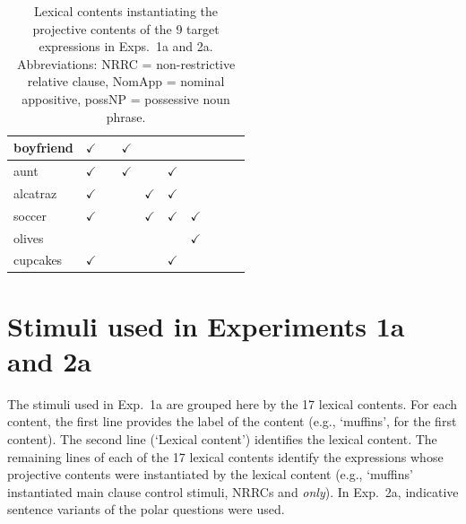 \documentclass[11pt,fleqn]{article}
\newcommand{\6}{\mbox{$[\hspace*{-.6mm}[$}}
\newcommand{\9}{\mbox{$]\hspace*{-.6mm}]$}}
\begin{document}
\begin{table}[h!]
\begin{center}
\begin{tabular}{l|ccccccccc}
boyfriend & $\checkmark$ & & $\checkmark$ & & & & & &  \\

\hline

aunt & $\checkmark$ & & $\checkmark$ & & $\checkmark$ & & & &  \\

\hline

alcatraz & $\checkmark$ & & & $\checkmark$ & $\checkmark$ & & & &  \\

\hline

soccer & $\checkmark$ & & & $\checkmark$ & $\checkmark$ & $\checkmark$ & & &  \\

\hline

olives & & & & & & $\checkmark$ & & &  \\

\hline

cupcakes & $\checkmark$ & & & & $\checkmark$ & & & &  \\

\hline

\end{tabular}
\end{center}
\caption{Lexical contents instantiating the projective contents of the 9 target expressions in Exps.~1a and 2a. Abbreviations: NRRC = non-restrictive relative clause, NomApp = nominal appositive, possNP = possessive noun phrase.}\label{t-trigger-content-pairs}
\end{table}

\section{Stimuli used in Experiments 1a and 2a}\label{a-exp1a-2a-stimuli}

The stimuli used in Exp.~1a are grouped here by the 17 lexical contents. For each content, the first line provides the label of the content (e.g., `muffins', for the first content). The second line (`Lexical content') identifies the lexical content. The remaining lines of each of the 17 lexical contents identify the expressions whose projective contents were instantiated by the lexical content (e.g., `muffins' instantiated main clause control stimuli, NRRCs and {\em only}). In Exp.~2a, indicative sentence variants of the polar questions were used.
\end{document}
